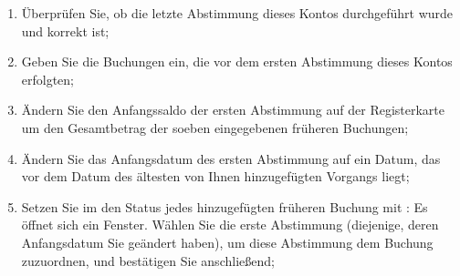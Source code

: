\begin{enumerate}
	\item Überprüfen Sie, ob die letzte Abstimmung dieses Kontos durchgeführt wurde und korrekt ist;
	\item Geben Sie die Buchungen ein, die vor dem ersten Abstimmung dieses Kontos erfolgten;
	\item Ändern Sie den Anfangssaldo der ersten Abstimmung auf der Registerkarte  um den Gesamtbetrag der soeben eingegebenen früheren Buchungen;
	\item Ändern Sie das Anfangsdatum des ersten Abstimmung auf ein Datum, das vor dem Datum des ältesten von Ihnen hinzugefügten Vorgangs liegt;
	\item Setzen Sie im  den Status jedes hinzugefügten früheren Buchung mit : Es öffnet sich ein Fenster. Wählen Sie die erste Abstimmung (diejenige, deren Anfangsdatum Sie geändert haben), um diese Abstimmung dem Buchung zuzuordnen, und bestätigen Sie anschließend;

\end{enumerate}
